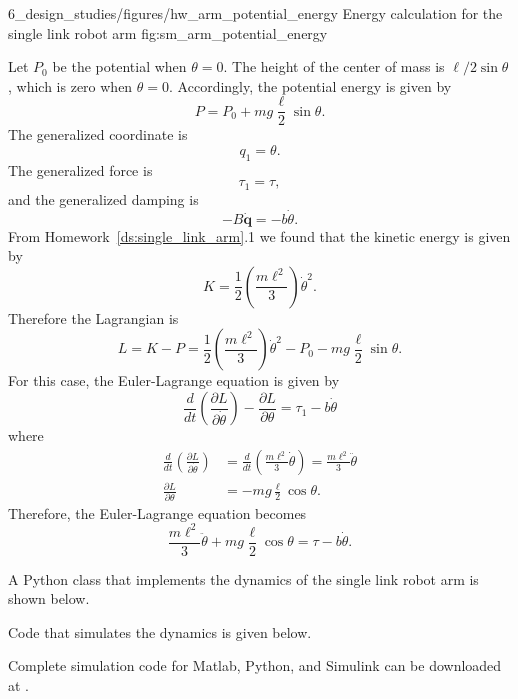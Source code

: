 
	{6_design_studies/figures/hw_arm_potential_energy}
	{Energy calculation for the single link robot arm}
	{fig:sm_arm_potential_energy}

Let $P_0$ be the potential when $\theta=0$.  The height of the center of mass is $\ell/2 \sin\theta$, which is zero when $\theta=0$.  Accordingly, the potential energy is given by
\[
P = P_0 + mg \frac{\ell}{2} \sin\theta.
\]
The generalized coordinate is 
\[
q_1= \theta.
\]
The generalized force is 
\[
\tau_1=\tau,
\]
and the generalized damping is 
\[
-B\dot{\mathbf{q}} = - b\dot{\theta}.
\]
From Homework~\ref{ds:single_link_arm}.1 we found that the kinetic energy is given by
\[
K=\frac{1}{2}\left(\frac{m\ell^2}{3}\right)\dot{\theta}^2.
\]
Therefore the Lagrangian is
\[
L = K - P = \frac{1}{2}\left(\frac{m\ell^2}{3}\right)\dot{\theta}^2 - P_0 - mg\frac{\ell}{2} \sin\theta.
\]
For this case, the Euler-Lagrange equation is given by
\[
\frac{d}{dt}\left(\frac{\partial L}{\partial \dot{\theta}}\right) - \frac{\partial L}{\partial \theta} = \tau_1 - b\dot{\theta}
\]
where
\begin{align*}
\frac{d}{dt}\left(\frac{\partial L}{\partial \dot{\theta}}\right) &= \frac{d}{dt}\left(\frac{m\ell^2}{3}\dot{\theta}\right) = \frac{m\ell^2}{3}\ddot{\theta} \\
\frac{\partial L}{\partial \theta} &= -mg\frac{\ell}{2}\cos\theta. 
\end{align*}
Therefore, the Euler-Lagrange equation becomes
\begin{equation}\label{eq:sm_arm_nonlinear_eom}
\frac{m\ell^2}{3}\ddot{\theta} + mg\frac{\ell}{2}\cos\theta = \tau - b\dot{\theta}.
\end{equation}

A Python class that implements the dynamics of the single link robot arm is shown below.


Code that simulates the dynamics is given below.


Complete simulation code for Matlab, Python, and Simulink can be downloaded at .
